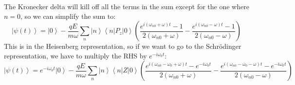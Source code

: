 \documentclass[12pt]{article}
\begin{document}
The Kronecker delta will kill off all the terms in the sum except for the one where $n=0$, so we can simplify the sum to:
\begin{equation}
\left|\psi(t)\right\rangle = \left|0\right\rangle - \frac{q E}{m \omega} \sum_{n} \left|n\right\rangle \left\langle n\left|P_{z}\right|0\right\rangle \left( \frac{e^{i (\omega _{n0} + \omega) t} - 1}{2 (\omega _{n0} + \omega)} - \frac{e^{i (\omega _{n0} - \omega) t} - 1}{2 (\omega _{n0} - \omega)} \right)
\end{equation}
This is in the Heisenberg representation, so if we want to go to the Schrödinger representation, we have to multiply the RHS by $e^{-i \omega _0 t}$:
\begin{equation}
\left|\psi(t)\right\rangle = e^{-i \omega _0 t} \left|0\right\rangle - \frac{q E}{m \omega} \sum_{n} \left|n\right\rangle \left\langle n\left|Z\right|0\right\rangle \left( \frac{e^{i\left(\omega_{n 0}-\omega_0+\omega\right) t}-e^{-i \omega_0 t}}{2\left(\omega_{n 0}+\omega\right)}-\frac{e^{i\left(\omega_{n 0}-\omega_0-\omega\right) t}-e^{-i \omega_0 t}}{2\left(\omega_{n 0}-\omega\right)} \right)
\end{equation}
\end{document}
